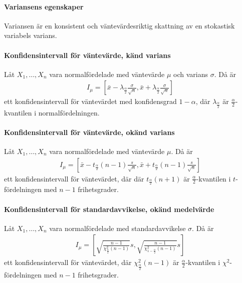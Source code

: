 \proof

\paragraph{Variansens egenskaper}
Variansen är en konsistent och väntevärdesriktig skattning av en stokastisk variabels varians.

\proof

\paragraph{Konfidensintervall för väntevärde, känd varians}
Låt $X_1, \dots, X_{n}$ vara normalfördelade med väntevärde $\mu$ och varians $\sigma$. Då är
\begin{align*}
	I_{\mu} = \left[\bar{x} - \lambda_{\frac{\alpha}{2}}\frac{\sigma}{\sqrt{n}}, \bar{x} + \lambda_{\frac{\alpha}{2}}\frac{\sigma}{\sqrt{n}}\right]
\end{align*}
ett konfidensintervall för väntevärdet med konfidensgrad $1 - \alpha$, där $\lambda_{\frac{\alpha}{2}}$ är $\frac{\alpha}{2}$-kvantilen i normalfördelningen.

\proof

\paragraph{Konfidensintervall för väntevärde, okänd varians}
Låt $X_1, \dots, X_{n}$ vara normalfördelade med väntevärde $\mu$. Då är
\begin{align*}
	I_{\mu} = \left[\bar{x} - t_{\frac{\alpha}{2}}(n - 1)\frac{s}{\sqrt{n}}, \bar{x} + t_{\frac{\alpha}{2}}(n - 1)\frac{s}{\sqrt{n}}\right]
\end{align*}
ett konfidensintervall för väntevärdet, där där $t_{\frac{\alpha}{2}}(n + 1)$ är $\frac{\alpha}{2}$-kvantilen i $t$-fördelningen med $n - 1$ frihetsgrader.

\proof

\paragraph{Konfidensintervall för standardavvikelse, okänd medelvärde}
Låt $X_1, \dots, X_{n}$ vara normalfördelade med standardavvikelse $\sigma$. Då är
\begin{align*}
	I_{\mu} = \left[\sqrt{\frac{n - 1}{\chi_{\frac{\alpha}{2}}^2(n - 1)}}s, \sqrt{\frac{n - 1}{\chi_{1 - \frac{\alpha}{2}}^2(n - 1)}}s\right]
\end{align*}
ett konfidensintervall för väntevärdet, där $\chi_{\frac{\alpha}{2}}^2(n - 1)$ är $\frac{\alpha}{2}$-kvantilen i $\chi^2$-fördelningen med $n - 1$ frihetsgrader.

